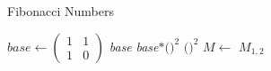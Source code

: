 \documentclass[a4paper]{article}
\begin{document}
\begin{algorithm}
				\caption{Fibonacci Numbers}
				\begin{algorithmic}
						\State $\textit{base} \gets \left(\begin{smallmatrix}1&1\\1&0\end{smallmatrix}\right)$
						\State \Return \textit{base}
						\State \Return \textit{base}$ * ($$)^2$
						\Else 
						\State \Return $($$)^2$
						\EndIf
						\EndFunction
						\State $M \gets $ 
						\State \Return $M_{1,2}$
						\EndFunction
				\end{algorithmic}
\end{algorithm}
\end{document}
